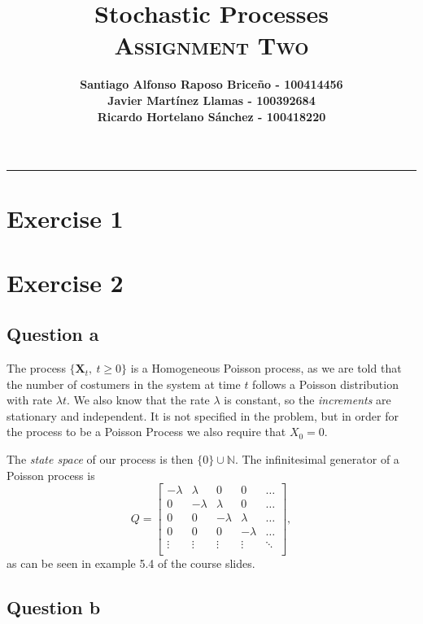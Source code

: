 \documentclass[11pt, a4paper]{article}
\title{\vspace{-8ex} \huge \bfseries Stochastic Processes\\
	\LARGE \normalfont \textsc{Assignment Two} \vspace{-2ex}}
\author{\bfseries Santiago Alfonso Raposo Briceño - 100414456 \\
	\bfseries Javier Martínez Llamas - 100392684\\
	\bfseries Ricardo Hortelano Sánchez - 100418220}
\date{\vspace{-5ex}} %
\begin{document}
	\maketitle
	\hrule

\section{Exercise 1}

\section{Exercise 2}
\subsection*{Question a}
The process $\{\bm{X}_t, \ t\geq 0\}$ is a Homogeneous Poisson process, as we are told that the number of costumers in the system at time $t$ follows a Poisson distribution with rate $\lambda t$. 
We also know that the rate $\lambda$ is constant, so the \emph{increments} are stationary and independent.
It is not specified in the problem, but in order for the process to be a Poisson Process we also require that $X_0 = 0$.

The \emph{state space} of our process is then $\{0\} \cup \mathbb{N}$. The infinitesimal generator of a Poisson process is
\[
Q = \begin{bmatrix}
	-\lambda & \lambda & 0 & 0 & \dots \\
	0 & -\lambda &\lambda  & 0 & \dots \\
	0 & 0 & -\lambda &\lambda & \dots \\
	0 & 0 & 0 & -\lambda & \dots \\
	\vdots &\vdots &\vdots &\vdots & \ddots \\
\end{bmatrix},
\]
as can be seen in example 5.4 of the course slides.

\subsection*{Question b}
\end{document}
